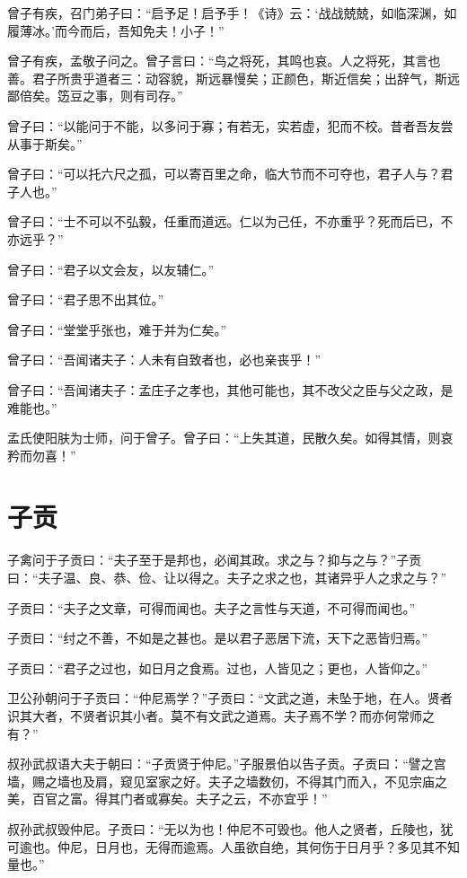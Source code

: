 \documentclass[a5paper]{ctexbook}
\begin{document}
    曾子有疾，召门弟子曰：“启予足！启予手！《诗》云：‘战战兢兢，如临深渊，如履薄冰。’而今而后，吾知免夫！小子！”

    曾子有疾，孟敬子问之。曾子言曰：“鸟之将死，其鸣也哀。人之将死，其言也善。君子所贵乎道者三：动容貌，斯远暴慢矣；正颜色，斯近信矣；出辞气，斯远鄙倍矣。笾豆之事，则有司存。”

    曾子曰：“以能问于不能，以多问于寡；有若无，实若虚，犯而不校。昔者吾友尝从事于斯矣。”
    
    曾子曰：“可以托六尺之孤，可以寄百里之命，临大节而不可夺也，君子人与？君子人也。”
    
    曾子曰：“士不可以不弘毅，任重而道远。仁以为己任，不亦重乎？死而后已，不亦远乎？”

    曾子曰：“君子以文会友，以友辅仁。”
    
    曾子曰：“君子思不出其位。”

    曾子曰：“堂堂乎张也，难于并为仁矣。”
    
    曾子曰：“吾闻诸夫子：人未有自致者也，必也亲丧乎！”
    
    曾子曰：“吾闻诸夫子：孟庄子之孝也，其他可能也，其不改父之臣与父之政，是难能也。”

    孟氏使阳肤为士师，问于曾子。曾子曰：“上失其道，民散久矣。如得其情，则哀矜而勿喜！”

    \chapter{子贡}

    子禽问于子贡曰：“夫子至于是邦也，必闻其政。求之与？抑与之与？”子贡曰：“夫子温、良、恭、俭、让以得之。夫子之求之也，其诸异乎人之求之与？”

    子贡曰：“夫子之文章，可得而闻也。夫子之言性与天道，不可得而闻也。”

    子贡曰：“纣之不善，不如是之甚也。是以君子恶居下流，天下之恶皆归焉。”
    
    子贡曰：“君子之过也，如日月之食焉。过也，人皆见之；更也，人皆仰之。”
    
    卫公孙朝问于子贡曰：“仲尼焉学？”子贡曰：“文武之道，未坠于地，在人。贤者识其大者，不贤者识其小者。莫不有文武之道焉。夫子焉不学？而亦何常师之有？”

    叔孙武叔语大夫于朝曰：“子贡贤于仲尼。”子服景伯以告子贡。子贡曰：“譬之宫墙，赐之墙也及肩，窥见室家之好。夫子之墙数仞，不得其门而入，不见宗庙之美，百官之富。得其门者或寡矣。夫子之云，不亦宜乎！”

    叔孙武叔毁仲尼。子贡曰：“无以为也！仲尼不可毁也。他人之贤者，丘陵也，犹可逾也。仲尼，日月也，无得而逾焉。人虽欲自绝，其何伤于日月乎？多见其不知量也。”
\end{document}
